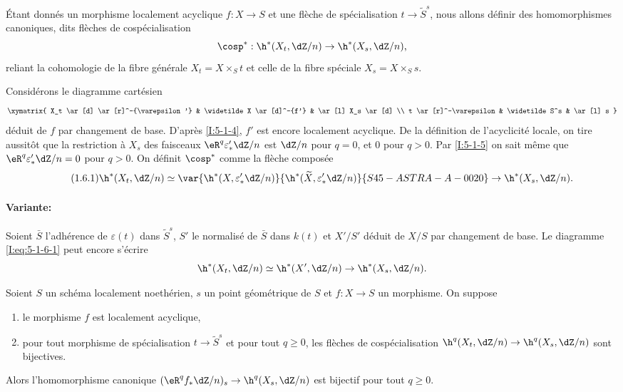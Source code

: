 \begin{sourceinline}\label{I:5-1-6}

Étant donnés un morphisme localement acyclique $f:X\to S$ et une flèche de 
spécialisation $t\to \widetilde S^s$, nous allons définir des 
homomorphismes canoniques, dits flèches de cospécialisation 
\[
  \cosp^* : \h^*(X_t,\dZ/n) \to \h^*(X_s,\dZ/n)\text{,}
\]
reliant la cohomologie de la fibre générale $X_t=X\times_S t$ et celle de la 
fibre spéciale $X_s=X\times_S s$. 
\end{sourceinline}
Considérons le diagramme cartésien 
\[\xymatrix{
  X_t \ar[d] \ar[r]^-{\varepsilon'} 
    & \widetilde X \ar[d]^-{f'} 
    & \ar[l] X_s \ar[d] \\
  t \ar[r]^-\varepsilon 
    & \widetilde S^s 
    & \ar[l] s
}\]
déduit de $f$ par changement de base. D'après \ref{I:5-1-4}, $f'$ est encore 
localement acyclique. De la définition de l'acyclicité locale, on tire 
aussitôt que la restriction à $X_s$ des faisceaux $\eR^q \varepsilon_*' \dZ/n$ 
est $\dZ/n$ pour $q=0$, et $0$ pour $q>0$. Par \ref{I:5-1-5} on sait même que 
$\eR^q \varepsilon_*'\dZ/n = 0$ pour $q>0$. On définit $\cosp^*$ comme la 
flèche composée 
\begingroup
\makeatletter
\tagsleft@true
\let\veqno\@@leqno
\makeatother
\begin{equation*}\tag{1.6.1}\label{I:eq:5-1-6-1}
  \h^*(X_t,\dZ/n) \simeq \var{\h^*(X,\varepsilon_*' \dZ/n)}{\h^*(\widetilde X,\varepsilon_*' \dZ/n)}{S45-ASTRA-A-0020} \to \h^*(X_s,\dZ/n) \text{.}
\end{equation*}
\endgroup

\paragraph{Variante:}
Soient $\bar S$ l'adhérence de $\varepsilon(t)$ dans $\widetilde S^s$, $S'$ le 
normalisé de $\bar S$ dans $k(t)$ et $X'/S'$ déduit de $X/S$ par changement 
de base. Le diagramme \eqref{I:eq:5-1-6-1} peut encore s'écrire 
\[
  \h^*(X_t,\dZ/n) \simeq \h^*(X',\dZ/n) \to \h^*(X_s,\dZ/n) \text{.}
\]





\begin{theoremdotdash}\label{I:5-1-7}
Soient $S$ un schéma localement noethérien, $s$ un point géométrique de 
$S$ et $f:X\to S$ un morphisme. On suppose 
\begin{enumerate}[\indent a)]
  \item le morphisme $f$ est localement acyclique, 
  \item pour tout morphisme de spécialisation $t\to \widetilde S^s$ et pour 
    tout $q\geqslant 0$, les flèches de cospécialisation 
    $\h^q(X_t,\dZ/n) \to \h^q(X_s,\dZ/n)$ sont bijectives.
\end{enumerate}

Alors l'homomorphisme canonique $(\eR^q f_*\dZ/n)_s\to \h^q(X_s,\dZ/n)$ est 
bijectif pour tout $q\geqslant 0$. 
\end{theoremdotdash}

